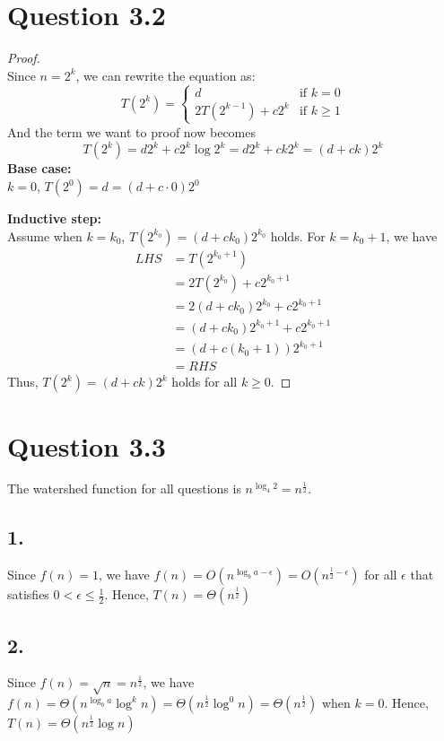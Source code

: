 \documentclass[a4paper,12pt]{article}
\begin{document}
\section*{Question 3.2}
\begin{proof}
$ $\\
Since $n = 2^k$, we can rewrite the equation as:
\begin{equation*}
	T(2^k) = 
	\begin{cases}
		d & \text{if } k = 0\\
		2T(2^{k-1}) + c2^k & \text{if } k \geq 1
	\end{cases}
\end{equation*}
And the term we want to proof now becomes
\begin{equation*}
	T(2^k) = d2^k + c2^k \log 2^k = d2^k + ck2^k = (d+ck)2^k
\end{equation*}
\textbf{Base case:} \\
$k = 0$, $T(2^0) = d = (d+c\cdot 0)2^0$

\textbf{Inductive step:} \\
Assume when $k = k_0$, $T(2^{k_0}) = (d+ck_0)2^{k_0}$ holds.
For $k = k_0 + 1$, we have
\begin{align*}
	LHS &= T(2^{k_0 + 1}) \\
	&= 2T(2^{k_0}) + c2^{k_0 + 1} \\
	&= 2(d+ck_0)2^{k_0} + c2^{k_0 + 1} \\
	&= (d+ck_0)2^{k_0+1} + c2^{k_0 + 1} \\
	&= (d+c(k_0+1))2^{k_0+1} \\
	&= RHS
\end{align*}
Thus, $T(2^k) = (d+ck)2^k$ holds for all $k \geq 0$.
\end{proof}

\section*{Question 3.3}
The watershed function for all questions is $n^{\log_4 2} = n^{\frac{1}{2}}$.

\subsection*{1.}
Since $f(n) = 1$, we have $f(n) = O(n^{\log_b a -\epsilon}) = O(n^{\frac{1}{2} -\epsilon})$ for all $\epsilon$ that satisfies $0 < \epsilon \leq \frac{1}{2}$.
Hence, $T(n) = \Theta(n^{\frac{1}{2}})$

\subsection*{2.}
Since $f(n) = \sqrt{n} = n^{\frac{1}{2}}$, we have $f(n) = \Theta(n^{\log_b a}\log^k n) = \Theta(n^{\frac{1}{2}}\log^0 n) = \Theta(n^{\frac{1}{2}})$ when $k = 0$.
Hence, $T(n) = \Theta(n^{\frac{1}{2}}\log n)$
\end{document}
